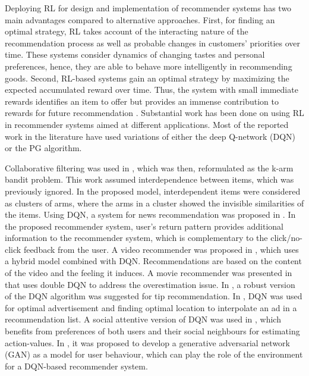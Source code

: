 \documentclass[journal]{IEEEtran}
\begin{document}
Deploying RL for design and implementation of recommender systems has two main advantages compared to alternative approaches. First, for finding an optimal strategy, RL takes account of the interacting nature of the recommendation process as well as probable changes in customers' priorities over time. These systems consider dynamics of changing tastes and personal preferences, hence, they are able to behave more intelligently in recommending goods. Second, RL-based systems gain an optimal strategy by maximizing the expected accumulated reward over time. Thus, the system with small immediate rewards identifies an item to offer but provides an immense contribution to rewards for future recommendation \cite{zhao2017deep}. Substantial work has been done on using RL in recommender systems aimed at different applications. Most of the reported work in the literature have used variations of either the deep Q-network (DQN) or the PG algorithm. 

Collaborative filtering was used in \cite{art1},   which was then, reformulated as the k-arm bandit problem. This work assumed interdependence between items, which was previously ignored. In the proposed model, interdependent items were considered as clusters of arms, where the arms in a cluster showed the invisible similarities of the items. Using DQN, a system for news recommendation was proposed in \cite{zheng2018drn}. In the proposed recommender system, user's return pattern provides additional information to the recommender system, which is complementary to the click/no-click feedback from the user. A video recommender was proposed in \cite{tripathi2018role}, which uses a hybrid model combined with DQN. Recommendations are based on the content of the video and the feeling it induces. A movie recommender was presented in \cite{zhao2018deep} that uses double DQN to address the overestimation issue. In \cite{chen2018stabilizing}, a robust version of the DQN algorithm was suggested for tip recommendation. In \cite{zhao2019deep}, DQN was used for optimal advertisement and finding optimal location to interpolate an ad in a recommendation list. A social attentive version of DQN was used in \cite{lei2019social}, which benefits from preferences of both users and their social neighbours for estimating action-values. In \cite{pmlr-v97-chen19f}, it was proposed to develop a generative adversarial network (GAN) as a model for user behaviour, which can play the role of the environment for a DQN-based recommender system. 
\end{document}
